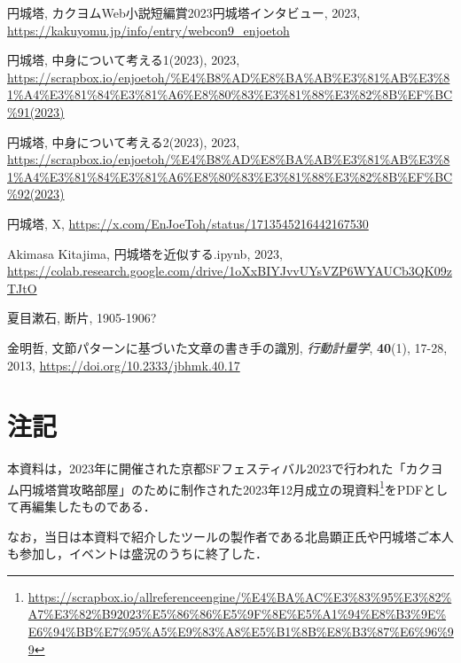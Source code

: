 \documentclass[10pt, a5paper, twoside]{jsarticle}
\theoremstyle{definition}
\begin{document}
	\begin{thebibliography}{99}

		 円城塔, カクヨムWeb小説短編賞2023円城塔インタビュー, 2023, \url{https://kakuyomu.jp/info/entry/webcon9_enjoetoh}

		 円城塔, 中身について考える1(2023), 2023, \url{https://scrapbox.io/enjoetoh/%E4%B8%AD%E8%BA%AB%E3%81%AB%E3%81%A4%E3%81%84%E3%81%A6%E8%80%83%E3%81%88%E3%82%8B%EF%BC%91(2023)}

		 円城塔, 中身について考える2(2023), 2023, \url{https://scrapbox.io/enjoetoh/%E4%B8%AD%E8%BA%AB%E3%81%AB%E3%81%A4%E3%81%84%E3%81%A6%E8%80%83%E3%81%88%E3%82%8B%EF%BC%92(2023)}

		 円城塔, X, \url{https://x.com/EnJoeToh/status/1713545216442167530}

		 Akimasa Kitajima, 円城塔を近似する.ipynb, 2023, \url{https://colab.research.google.com/drive/1oXxBIYJvvUYsVZP6WYAUCb3QK09zTJtO}

		 夏目漱石, 断片, 1905-1906?

		 金明哲, 文節パターンに基づいた文章の書き手の識別, \textit{行動計量学}, \textbf{40}(1), 17-28, 2013, \url{https://doi.org/10.2333/jbhmk.40.17}

	\end{thebibliography}

	\section*{注記}

		本資料は，2023年に開催された京都SFフェスティバル2023で行われた「カクヨム円城塔賞攻略部屋」のために制作された2023年12月成立の現資料\footnote{\url{https://scrapbox.io/allreferenceengine/%E4%BA%AC%E3%83%95%E3%82%A7%E3%82%B92023%E5%86%86%E5%9F%8E%E5%A1%94%E8%B3%9E%E6%94%BB%E7%95%A5%E9%83%A8%E5%B1%8B%E8%B3%87%E6%96%99}}をPDFとして再編集したものである．

		なお，当日は本資料で紹介したツールの製作者である北島顕正氏や円城塔ご本人も参加し，イベントは盛況のうちに終了した．
\end{document}
